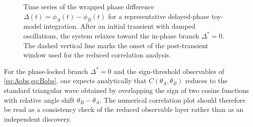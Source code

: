\documentclass[11pt]{article}
\begin{document}
        \begin{figure}[t]
            \centering
            \caption{Time series of the wrapped phase difference \(\Delta(t)=\phi_A(t)-\phi_B(t)\) for a representative delayed-phase toy-model integration. After an initial transient with damped oscillations, the system relaxes toward the in-phase branch \(\Delta^\ast=0\). The dashed vertical line marks the onset of the post-transient window used for the reduced correlation analysis.}
            \label{fig:delay_phase_time_series}
        \end{figure}

        For the phase-locked branch \(\Delta^\ast=0\) and the sign-threshold observables of \cref{eq:Aobs,eq:Bobs}, one expects analytically that \(C(\theta_A,\theta_B)\) reduces to the standard triangular wave obtained by overlapping the sign of two cosine functions with relative angle shift \(\theta_B-\theta_A\). The numerical correlation plot should therefore be read as a consistency check of the reduced observable layer rather than as an independent discovery.
\end{document}
